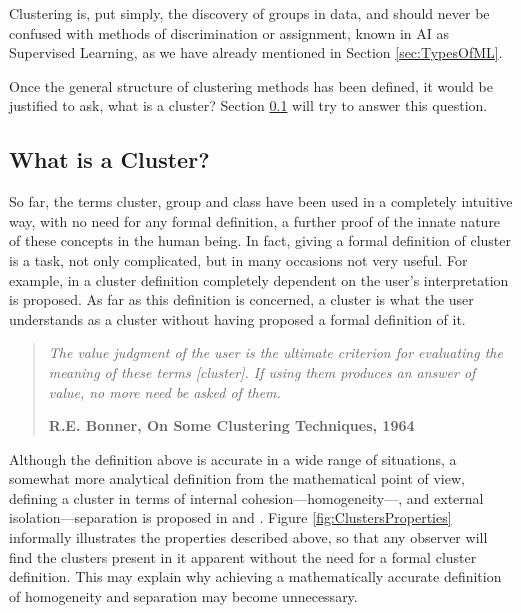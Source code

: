 Clustering is, put simply, the discovery of groups in data, and should never be confused with methods of discrimination or assignment, known in \acs{AI} as Supervised Learning, as we have already mentioned in Section \ref{sec:TypesOfML}. 

Once the general structure of clustering methods has been defined, it would be justified to ask, what is a cluster? Section \ref{sec:WhatIsCluster} will try to answer this question.

\subsection{What is a Cluster?} \label{sec:WhatIsCluster}

So far, the terms cluster, group and class have been used in a completely intuitive way, with no need for any formal definition, a further proof of the innate nature of these concepts in the human being. In fact, giving a formal definition of cluster is a task, not only complicated, but in many occasions not very useful. For example, in \cite{lance1967general} a cluster definition completely dependent on the user's interpretation is proposed. As far as this definition is concerned, a cluster is what the user understands as a cluster without having proposed a formal definition of it.

\begin{quotation}{\slshape
		The value judgment of the user is the ultimate criterion for evaluating the meaning of these terms [cluster]. If using them produces an answer of value, no more need be asked of them.}
	\begin{flushright}
		\textbf{R.E. Bonner, On Some Clustering Techniques, 1964} 
	\end{flushright}
\end{quotation}

Although the definition above is accurate in a wide range of situations, a somewhat more analytical definition from the mathematical point of view, defining a cluster in terms of internal cohesion---homogeneity---, and external isolation---separation is proposed in \cite{cormack1971review} and \cite{gordon:1999}. Figure \ref{fig:ClustersProperties} informally illustrates the properties described above, so that any observer will find the clusters present in it apparent without the need for a formal cluster definition. This may explain why achieving a mathematically accurate definition of homogeneity and separation may become unnecessary.

